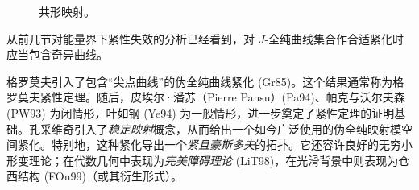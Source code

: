 \begin{figure}[htbp]
 \centering
 
 \caption{共形映射。}
 \label{fig:conformal-map-strip-disc}
\end{figure}

从前几节对能量界下紧性失效的分析已经看到，对 $J$-全纯曲线集合作合适紧化时应当包含奇异曲线。

格罗莫夫引入了包含“尖点曲线”的伪全纯曲线紧化 (Gr85)。这个结果通常称为格罗莫夫紧性定理。随后，皮埃尔·潘苏（Pierre Pansu）(Pa94)、帕克与沃尔夫森 (PW93) 为闭情形，叶如钢 (Ye94) 为一般情形，进一步奠定了紧性定理的证明基础。孔采维奇引入了\emph{稳定映射}概念，从而给出一个如今广泛使用的伪全纯映射模空间紧化。特别地，这种紧化导出一个\emph{紧且豪斯多夫}的拓扑。它还容许良好的无穷小形变理论；在代数几何中表现为\emph{完美障碍理论} (LiT98)，在光滑背景中则表现为仓西结构 (FOn99)（或其衍生形式）。
